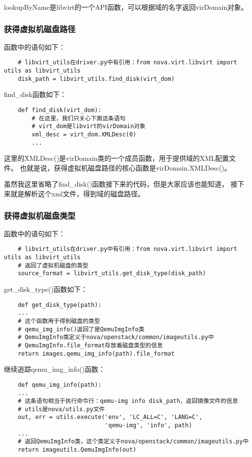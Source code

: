 \documentclass[a4paper,left=1.5cm,right=1.5cm,11pt]{article}
\begin{document}
	lookupByName是libvirt的一个API函数，可以根据域的名字返回virDomain对象。

\subsubsection{获得虚拟机磁盘路径}
	函数中的语句如下：
	\begin{lstlisting}
	# libvirt_utils在driver.py中有引用：from nova.virt.libvirt import utils as libvirt_utils
	disk_path = libvirt_utils.find_disk(virt_dom)
	\end{lstlisting}

	find\_disk函数如下：
	\begin{lstlisting}
	def find_disk(virt_dom):
		# 在这里，我们只关心下面这条语句
		# virt_dom是libvirt的virDomain对象
		xml_desc = virt_dom.XMLDesc(0)
		...
	\end{lstlisting}

	这里的XMLDesc()是virDomain类的一个成员函数，用于提供域的XML配置文件。
	也就是说，获得虚拟机磁盘路径的核心函数是virDomain.XMLDesc()。\par

	虽然我这里省略了find\_disk()函数接下来的代码，但是大家应该也能知道，
	接下来就是解析这个xml文件，得到域的磁盘路径。

\subsubsection{获得虚拟机磁盘类型}
	函数中的语句如下：
	\begin{lstlisting}
	# libvirt_utils在driver.py中有引用：from nova.virt.libvirt import utils as libvirt_utils
	# 返回了虚拟机磁盘的类型
	source_format = libvirt_utils.get_disk_type(disk_path)
	\end{lstlisting}

	get\_disk\_type()函数如下：
	\begin{lstlisting}
	def get_disk_type(path):
    ...
	# 这个函数用于得到磁盘的类型
	# qemu_img_info()返回了是QemuImgInfo类
	# QemuImgInfo类定义于nova/openstack/common/imageutils.py中
	# QemuImgInfo.file_format存放着磁盘类型的信息
    return images.qemu_img_info(path).file_format
	\end{lstlisting}

	继续追踪qemu\_img\_info()函数：
	\begin{lstlisting}
	def qemu_img_info(path):
    ...
	# 这条语句相当于执行命令行：qemu-img info disk_path，返回镜像文件的信息
	# utils是nova/utils.py文件
    out, err = utils.execute('env', 'LC_ALL=C', 'LANG=C',
                             'qemu-img', 'info', path)
    ...
	# 返回QemuImgInfo类，这个类定义于nova/openstack/common/imageutils.py中
    return imageutils.QemuImgInfo(out)
	\end{lstlisting}
\end{document}
